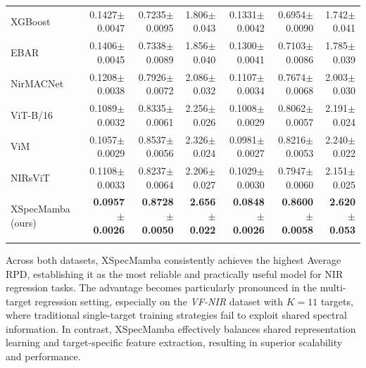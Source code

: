 \documentclass[pdflatex,sn-mathphys-num]{sn-jnl}%
\begin{document}
\begin{table}
\begin{tabular*}{\textheight}{@{\extracolsep\fill}lrrrrrr}
XGBoost &
0.1427{\scriptsize$\pm$0.0047} & 0.7235{\scriptsize$\pm$0.0095} & 1.806{\scriptsize$\pm$0.043} &
0.1331{\scriptsize$\pm$0.0042} & 0.6954{\scriptsize$\pm$0.0090} & 1.742{\scriptsize$\pm$0.041} \\

EBAR \cite{phan2025ebar} &
0.1406{\scriptsize$\pm$0.0045} & 0.7338{\scriptsize$\pm$0.0089} & 1.856{\scriptsize$\pm$0.040} &
0.1300{\scriptsize$\pm$0.0041} & 0.7103{\scriptsize$\pm$0.0086} & 1.785{\scriptsize$\pm$0.039} \\

\midrule

NirMACNet \cite{phuong2025nirmacnet} &
0.1208{\scriptsize$\pm$0.0038} & 0.7926{\scriptsize$\pm$0.0072} & 2.086{\scriptsize$\pm$0.032} &
0.1107{\scriptsize$\pm$0.0034} & 0.7674{\scriptsize$\pm$0.0068} & 2.003{\scriptsize$\pm$0.030} \\

ViT-B/16 \cite{dosovitskiy2021image} &
0.1089{\scriptsize$\pm$0.0032} & 0.8335{\scriptsize$\pm$0.0061} & 2.256{\scriptsize$\pm$0.026} &
0.1008{\scriptsize$\pm$0.0029} & 0.8062{\scriptsize$\pm$0.0057} & 2.191{\scriptsize$\pm$0.024} \\

ViM \cite{zhu2024vision} &
0.1057{\scriptsize$\pm$0.0029} & 0.8537{\scriptsize$\pm$0.0056} & 2.326{\scriptsize$\pm$0.024} &
0.0981{\scriptsize$\pm$0.0027} & 0.8216{\scriptsize$\pm$0.0053} & 2.240{\scriptsize$\pm$0.022} \\

NIRsViT \cite{van2024nirsvit} &
0.1108{\scriptsize$\pm$0.0033} & 0.8237{\scriptsize$\pm$0.0064} & 2.206{\scriptsize$\pm$0.027} &
0.1029{\scriptsize$\pm$0.0030} & 0.7947{\scriptsize$\pm$0.0060} & 2.151{\scriptsize$\pm$0.025} \\

\midrule

XSpecMamba (ours) &
\textbf{0.0957{\scriptsize$\pm$0.0026}} &
\textbf{0.8728{\scriptsize$\pm$0.0050}} &
\textbf{2.656{\scriptsize$\pm$0.022}} &
\textbf{0.0848{\scriptsize$\pm$0.0026}} &
\textbf{0.8600{\scriptsize$\pm$0.0058}} &
\textbf{2.620{\scriptsize$\pm$0.053}} \\

\botrule
\end{tabular*}
\end{table}

Across both datasets, XSpecMamba consistently achieves the highest Average RPD, establishing it as the most reliable and practically useful model for NIR regression tasks. The advantage becomes particularly pronounced in the multi-target regression setting, especially on the \textit{VF-NIR} dataset with $K = 11$ targets, where traditional single-target training strategies fail to exploit shared spectral information. In contrast, XSpecMamba effectively balances shared representation learning and target-specific feature extraction, resulting in superior scalability and performance.
\end{document}
